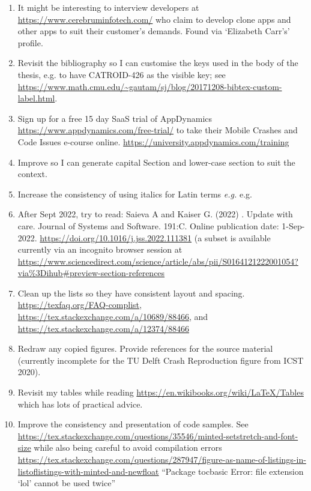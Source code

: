 \begin{enumerate}
    \item It might be interesting to interview developers at \url{https://www.cerebruminfotech.com/} who claim to develop clone apps and other apps to suit their customer's demands. Found via `Elizabeth Carr's' profile. 
    
    \item Revisit the bibliography so I can customise the keys used in the body of the thesis, e.g. to have CATROID-426 as the visible key; see \url{https://www.math.cmu.edu/~gautam/sj/blog/20171208-bibtex-custom-label.html}.
    
    \item Sign up for a free 15 day SaaS trial of AppDynamics \url{https://www.appdynamics.com/free-trial/} to take their Mobile Crashes and Code Issues e-course online. \url{https://university.appdynamics.com/training}
    
    \item Improve  so I can generate capital Section and lower-case section to suit the context.
    
    \item Increase the consistency of using italics for Latin terms \emph{e.g.} e.g.
    
    \item After  Sept 2022, try to read: Saieva A and Kaiser G. (2022) . Update with care. Journal of Systems and Software. 191:C. Online publication date: 1-Sep-2022. \url{https://doi.org/10.1016/j.jss.2022.111381} (a subset is available currently via an incognito browser session at \url{https://www.sciencedirect.com/science/article/abs/pii/S0164121222001054?via\%3Dihub\#preview-section-references}
    
    \item Clean up the lists so they have consistent layout and spacing. \url{https://texfaq.org/FAQ-complist}, \url{https://tex.stackexchange.com/a/10689/88466}, and \url{https://tex.stackexchange.com/a/12374/88466}

    \item Redraw any copied figures. Provide references for the source material (currently incomplete for the TU Delft Crash Reproduction figure from ICST 2020).
    
    \item Revisit my tables while reading \url{https://en.wikibooks.org/wiki/LaTeX/Tables} which has lots of practical advice.
    
    \item Improve the consistency and presentation of code samples. See \url{https://tex.stackexchange.com/questions/35546/minted-setstretch-and-font-size} while also being careful to avoid compilation errors \url{https://tex.stackexchange.com/questions/287947/figure-as-name-of-listings-in-listoflistings-with-minted-and-newfloat} ``Package tocbasic Error: file extension `lol' cannot be used twice''


\end{enumerate}
